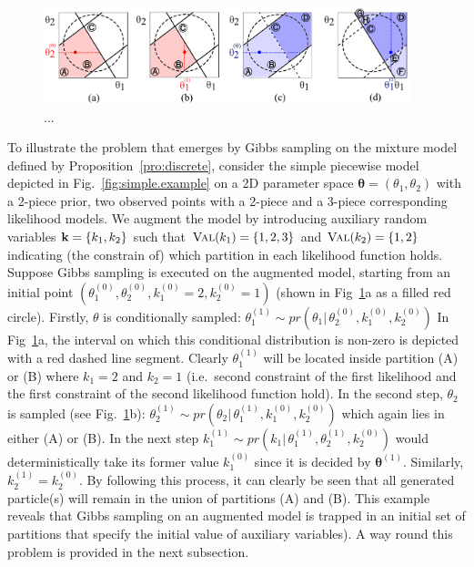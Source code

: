 \begin{figure}
  \centering
  \includegraphics[width=0.95\textwidth]{pic/col22.pdf}
\caption{...}
  \label{fig:blocking}
\end{figure}
To illustrate the problem that emerges by Gibbs sampling on the mixture model defined by 
Proposition~\ref{pro:discrete}, consider the simple piecewise model depicted in 
Fig.~\ref{fig:simple.example} on a 2D parameter space 
$\boldsymbol\theta = (\theta_1, \theta_2)$ with a 2-piece prior, two observed points with a 2-piece and a 3-piece corresponding likelihood models. 
We augment the model by introducing auxiliary random variables $\textbf{k} = \{k_1, k_2\}$
such that $\textsc{Val}(k_1) = \{1,2,3\}$ and $\textsc{Val}(k_2) = \{1,2\}$ indicating (the constrain of) which partition in each likelihood function holds. 
Suppose Gibbs sampling is executed on the augmented model, starting from an initial point
$(\theta_1^{(0)}, \theta_2^{(0)}, k_1^{(0)} = 2, k_2^{(0)} = 1)$ 
(shown in Fig~\ref{fig:blocking}a as a filled red circle).
Firstly, $\theta$ is conditionally sampled:
$\theta_1^{(1)} \sim pr(\theta_1 | \, \theta_2^{(0)}, k_1^{(0)}, k_2^{(0)}) $ 
In Fig~\ref{fig:blocking}a, the interval on which 
this conditional distribution is non-zero is depicted with a red dashed line segment.
Clearly $\theta_1^{(1)}$ will be located inside partition (A) or (B) where 
$k_1 = 2$ and $k_2 = 1$ (i.e.\ second constraint of the first likelihood and the first constraint of the second likelihood function hold).
In the second step, $\theta_2$ is sampled (see Fig.~\ref{fig:blocking}b):
$\theta_2^{(1)} \sim pr(\theta_2 | \, \theta_1^{(1)}, k_1^{(0)}, k_2^{(0)})$ which again lies in either (A) or (B).
In the next step  
$k_1^{(1)} \sim pr(k_1 | \, \theta_1^{(1)}, \theta_2^{(1)}, k_2^{(0)})$ would deterministically take its former value $k_1^{(0)}$ since it is decided by $\boldsymbol\theta^{(1)}$.
Similarly, $k_2^{(1)} = k_2^{(0)}$. By following this process, it can clearly be seen that all generated particle(s) will remain in the union of partitions (A) and (B). 
This example reveals that Gibbs sampling on an augmented model is trapped in an initial set of partitions  
that specify the initial value of auxiliary variables).
A way round this problem is provided in the next subsection.  

